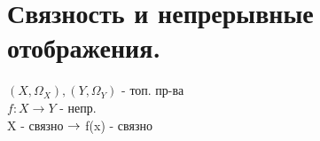 \documentclass[geometry.tex]{subfiles}
\begin{document}
  \section{Связность и непрерывные отображения.}

  \begin{theorem}
      $(X, \Omega_X), (Y, \Omega_Y)$ - топ. пр-ва\\
      $f: X \rightarrow Y$ - непр.\\
      X - связно $\rightarrow$ f(x) - связно
  \end{theorem}
\end{document}
